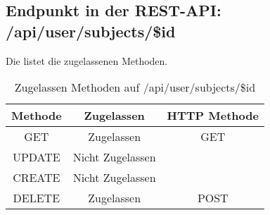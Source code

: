 \subsection{Endpunkt in der REST-API: /api/user/subjects/\$id}
Die  listet die zugelassenen Methoden. 

\begin{table}[!htbp]
	\begin{tabular}{|c|c|c|}
		\hline
			\textbf{Methode} & \textbf{Zugelassen} & \textbf{HTTP Methode} \\ \hline
			GET & Zugelassen & GET \\ \hline
			UPDATE & Nicht Zugelassen & \\ \hline 
			CREATE & Nicht Zugelassen & \\ \hline 
			DELETE & Zugelassen & POST \\ \hline
	\end{tabular}

		\caption{Zugelassen Methoden auf /api/user/subjects/\$id}
		\label{tab:end:rest:api:user:subjects:id:meth}
\end{table}